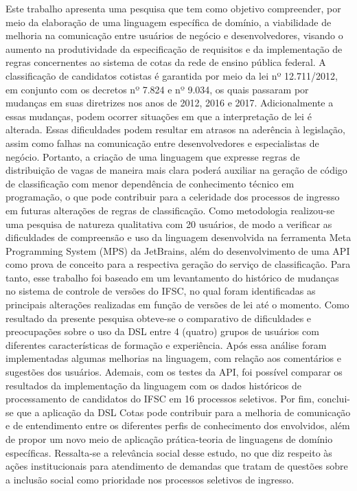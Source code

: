 
\begin{resumo}[Resumo] \noindent 
Este trabalho apresenta uma pesquisa que tem como objetivo compreender, por meio da elaboração de uma linguagem específica de domínio, a viabilidade de melhoria na comunicação entre usuários de negócio e desenvolvedores, visando o aumento na produtividade da especificação de requisitos e da implementação de regras concernentes ao sistema de cotas da rede de ensino pública federal. A classificação de candidatos cotistas é garantida por meio da lei nº 12.711/2012, em conjunto com os decretos nº 7.824 e nº 9.034, os quais passaram por mudanças em suas diretrizes nos anos de 2012, 2016 e 2017. Adicionalmente a essas mudanças, podem ocorrer situações em que a interpretação de lei é alterada. Essas dificuldades podem resultar em atrasos na aderência à legislação, assim como falhas na comunicação entre desenvolvedores e especialistas de negócio. Portanto, a criação de uma linguagem que expresse regras de distribuição de vagas de maneira mais clara poderá auxiliar na geração de código de classificação com menor dependência de conhecimento técnico em programação, o que pode contribuir para a celeridade dos processos de ingresso em futuras alterações de regras de classificação. Como metodologia realizou-se uma pesquisa de natureza qualitativa com 20 usuários, de modo a verificar as dificuldades de compreensão e uso da linguagem desenvolvida na ferramenta Meta Programming System (MPS) da JetBrains, além do desenvolvimento de uma \gls{API} como prova de conceito para a respectiva geração do serviço de classificação. Para tanto, esse trabalho foi baseado em um levantamento do histórico de mudanças no sistema de controle de versões do \gls{IFSC}, no qual foram identificadas as principais alterações realizadas em função de versões de lei até o momento. Como resultado da presente pesquisa obteve-se o comparativo de dificuldades e preocupações sobre o uso da DSL entre 4 (quatro) grupos de usuários com diferentes características de formação e experiência. Após essa análise foram implementadas algumas melhorias na linguagem, com relação aos comentários e sugestões dos usuários. Ademais, com os testes da \gls{API}, foi possível comparar os resultados da implementação da linguagem com os dados históricos de processamento de candidatos do IFSC em 16 processos seletivos. Por fim, conclui-se que a aplicação da DSL Cotas pode contribuir para a melhoria de comunicação e de entendimento entre os diferentes perfis de conhecimento dos envolvidos, além de propor um novo meio de aplicação prática-teoria de linguagens de domínio específicas. Ressalta-se a relevância social desse estudo, no que diz respeito às ações institucionais para atendimento de demandas que tratam de questões sobre a inclusão social como prioridade nos processos seletivos de ingresso.


\end{resumo}
